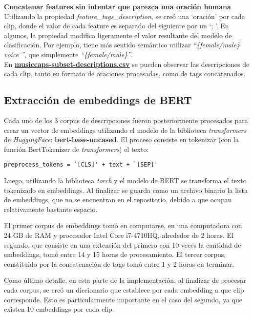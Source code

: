 \textbf{Concatenar features sin intentar que parezca una oración humana}\\
Utilizando la propiedad \textit{feature\_tags\_description}, se creó una `oración' por cada clip, donde el valor de cada feature es separado del siguiente por un `; '. En algunos, la propiedad modifica ligeramente el valor resultante del modelo de clasificación. Por ejemplo, tiene más sentido semántico utilizar \textit{``\{female/male\} voice ''}, que simplemente \textit{``\{female/male\}''}.\\

En \href{https://github.com/NileyGF/Busqueda-semantica-en-audios.-Tesis/blob/main/src/data/musiccaps-subset-descriptions.csv}{\textbf{musiccaps-subset-descriptions.csv}} se pueden observar las descripciones de cada clip, tanto en formato de oraciones procesadas, como de tags concatenados. 

\subsection{Extracción de embeddings de BERT}
\label{subsec:bert-embedd-extr}
Cada uno de los 3 corpus de descripciones fueron posteriormente procesados para crear un vector de embeddings utilizando el modelo de la biblioteca \textit{transformers} de \textit{HuggingFace}: \textbf{bert-base-uncased}. El proceso consiste en tokenizar (con la función BertTokenizer de 
\textit{transformers}) el texto: 
\begin{lstlisting}
preprocess_tokens = `[CLS]' + text + `[SEP]'
\end{lstlisting} 
Luego, utilizando la biblioteca \textit{torch} y el modelo de BERT se transforma el texto tokenizado en embeddings. Al finalizar se guarda como un archivo binario la lista de embeddings, que no se encuentran en el repositorio, debido a que ocupan relativamente bastante espacio.

El primer corpus de embeddings tomó en computarse, en una computadora con 24 GB de RAM y procesador Intel Core i7-4710HQ, alrededor de 2 horas. El segundo, que consiste en una extensión del primero con 10 veces la cantidad de embeddings, tomó entre 14 y 15 horas de procesamiento. El tercer corpus, 
constituido por la concatenación de tags tomó entre 1 y 2 horas en terminar.

Como último detalle, en esta parte de la implementación, al finalizar de procesar cada corpus, se creó un diccionario que establece por cada embedding a que clip corresponde. Esto es particularmente importante en el caso del segundo, ya que existen 10 embeddings por cada clip.

